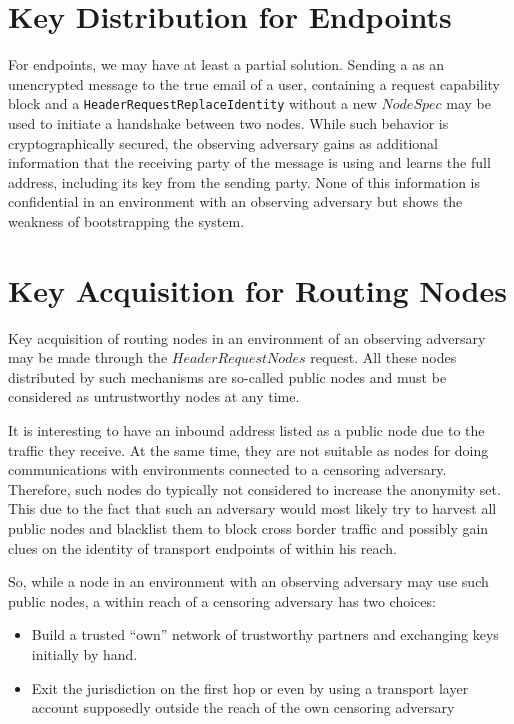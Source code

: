 \section{Key Distribution for Endpoints}
For endpoints, we may have at least a partial solution. Sending a \VortexMessage{} as an unencrypted message to the true email of a user, containing a request capability block and a \texttt{HeaderRequestReplaceIdentity} without a new $NodeSpec$ may be used to initiate a handshake between two nodes. While such behavior is cryptographically secured, the observing adversary gains as additional information that the receiving party of the message is using \MessageVortex{} and learns the full address, including its key from the sending party. None of this information is confidential in an environment with an observing adversary but shows the weakness of bootstrapping the system.

\section{Key Acquisition for Routing Nodes}
Key acquisition of routing nodes in an environment of an observing adversary may be made through the $HeaderRequestNodes$ request. All these nodes distributed by such mechanisms are so-called public nodes and must be considered as untrustworthy nodes at any time. 

It is interesting to have an inbound address listed as a public node due to the traffic they receive. At the same time, they are not suitable as nodes for doing communications with environments connected to a censoring adversary. Therefore, such nodes do typically not considered to increase the anonymity set. This due to the fact that such an adversary would most likely try to harvest all public nodes and blacklist them to block cross border traffic and possibly gain clues on the identity of transport endpoints of \VortexNodes{} within his reach.

So, while a node in an environment with an observing adversary may use such public nodes, a \VortexNode{} within reach of a censoring adversary has two choices:
\begin{itemize}
	\item Build a trusted ``own'' network of trustworthy partners and exchanging keys initially by hand.
	\item Exit the jurisdiction on the first hop or even by using a transport layer account supposedly outside the reach of the own censoring adversary
\end{itemize}

